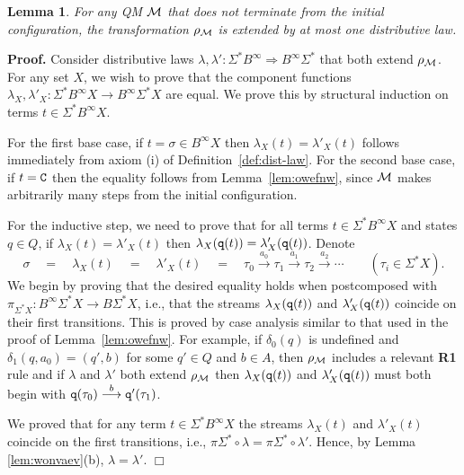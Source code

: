 \documentclass[adraft,copyright,creativecommons]{eptcs}
\newtheorem{lemma}[theorem]{Lemma}
\newenvironment{proof}[1][Proof]{\noindent\textbf{#1.} }{{\hfill $\Box$ \\}}
\newcommand{\To}{\Longrightarrow}
\newcommand{\Bb}{B^{\infty}}
\newcommand{\Ss}{\Sigma^*}
\newcommand{\goes}[1]{\stackrel{#1}{\longrightarrow}}
\begin{document}
\begin{lemma}\label{lem:ibvwavv}\rm
For any QM ${\cal M}$ that does not terminate from the initial configuration, the transformation $\rho_{\cal M}$ is extended by at most one distributive law.
\end{lemma}
\begin{proof}
Consider distributive laws $\lambda,\lambda':\Ss\Bb\To\Bb\Ss$ that both extend $\rho_{\cal M}$. For any set $X$, we wish to prove that the component functions $\lambda_X,\lambda'_X:\Ss\Bb X\to \Bb\Ss X$ are equal. We prove this by structural induction on terms $t\in\Ss\Bb X$.

For the first base case, if $t=\sigma\in\Bb X$ then $\lambda_X(t)=\lambda'_X(t)$ follows immediately from axiom (i) of Definition~\ref{def:dist-law}.
For the second base case, if $t={\tt C}$ then the equality follows from Lemma~\ref{lem:owefnw}, since ${\cal M}$ makes arbitrarily many steps from the initial configuration.

For the inductive step, we need to prove that for all terms $t\in\Ss\Bb X$ and states $q\in Q$, if $\lambda_X(t)=\lambda'_X(t)$ then $\lambda_X({\tt q}(t))=\lambda'_X({\tt q}(t))$. Denote 
\[
	\sigma \quad =\quad  \lambda_X(t)\quad =\quad \lambda'_X(t) \quad = \quad \tau_0\goes{a_0}\tau_1\goes{a_1}\tau_2\goes{a_2}\cdots \qquad (\tau_i\in\Ss X).
\]
We begin by proving that the desired equality holds when postcomposed with $\pi_{\Ss X}:\Bb\Ss X\to B\Ss X$, i.e., that the streams $\lambda_X({\tt q}(t))$ and $\lambda'_X({\tt q}(t))$ coincide on their first transitions. This is proved by case analysis similar to that used in the proof of Lemma~\ref{lem:owefnw}. For example, if $\delta_0(q)$ is undefined and $\delta_1(q,a_0)=(q',b)$ for some $q'\in Q$ and $b\in A$, then $\rho_{\cal M}$ includes a relevant {\bf R1} rule and if $\lambda$ and $\lambda'$ both extend $\rho_{\cal M}$ then $\lambda_X({\tt q}(t))$ and $\lambda'_X({\tt q}(t))$ must both begin with ${\tt q}(\tau_0)\goes{b}{\tt q'}(\tau_1)$.

We proved that for any term $t \in \Ss \Bb X$ the streams $\lambda_X(t)$ and $\lambda'_X(t)$ coincide on the first transitions, i.e., $\pi\Ss\circ\lambda=\pi\Ss\circ\lambda'$. Hence, by Lemma \ref{lem:wonvaev}(b), $\lambda=\lambda'$.
\end{proof}
\end{document}
